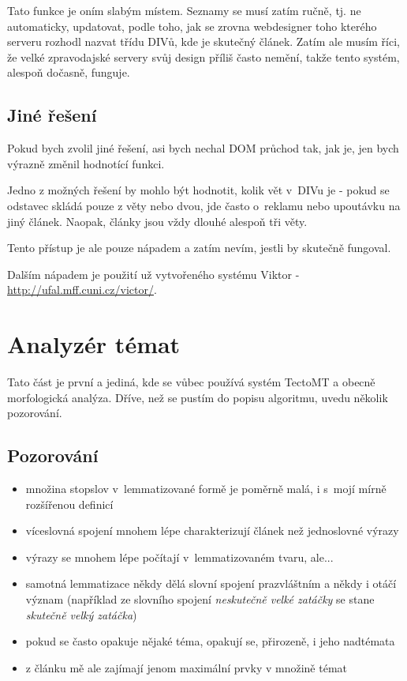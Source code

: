 \documentclass[12pt]{amsart}
\begin{document}
Tato funkce je oním slabým místem. Seznamy se musí zatím ručně, tj. ne automaticky, updatovat, podle toho, jak se zrovna webdesigner toho kterého serveru rozhodl nazvat třídu DIVů, kde je skutečný článek. Zatím ale musím říci, že velké zpravodajské servery svůj design příliš často nemění, takže tento systém, alespoň dočasně, funguje.

\subsection{Jiné řešení}
Pokud bych zvolil jiné řešení, asi bych nechal DOM průchod tak, jak je, jen bych výrazně změnil hodnotící funkci. 

Jedno z možných řešení by mohlo být hodnotit, kolik vět v~DIVu je - pokud se odstavec skládá pouze z věty nebo dvou, jde často o~reklamu nebo upoutávku na jiný článek. Naopak, články jsou vždy dlouhé alespoň tři věty.

Tento přístup je ale pouze nápadem a zatím nevím, jestli by skutečně fungoval.

Dalším nápadem je použití už vytvořeného systému Viktor - \url{http://ufal.mff.cuni.cz/victor/}.

\section{Analyzér témat}
Tato část je první a jediná, kde se vůbec používá systém TectoMT a obecně morfologická analýza. Dříve, než se pustím do popisu algoritmu, uvedu několik pozorování.
\subsection{Pozorování}
\begin{itemize}
    \item množina stopslov v~lemmatizované formě je poměrně malá, i s~mojí mírně rozšířenou definicí
    \item víceslovná spojení mnohem lépe charakterizují článek než jed\-no\-slov\-né vý\-ra\-zy
    \item výrazy se mnohem lépe počítají v~lemmatizovaném tvaru, ale...
    \item samotná lemmatizace  někdy dělá slovní spojení pra\-zvlášt\-ním a někdy i otáčí význam (například ze slovního spojení \emph{neskutečně velké zatáčky} se stane \emph{skutečně velký zatáčka})
    \item pokud se často opakuje nějaké téma, opakují se, přirozeně, i jeho nad\-té\-ma\-ta
    \item z článku mě ale zajímají jenom maximální prvky v množině témat
\end{itemize}
\end{document}
